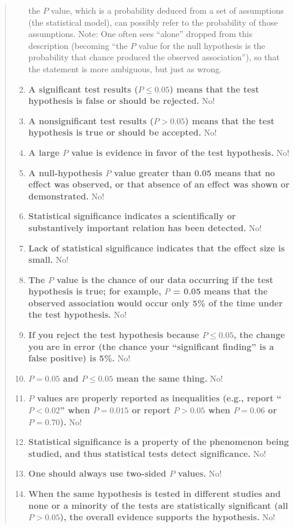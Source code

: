 \begin{quote}
\begin{enumerate}
    the $P$ value, which is a probability deduced from a set of
    assumptions (the statistical model), can possibly refer to the
    probability of those assumptions. Note: One often sees ``alone''
    dropped from this description (becoming ``the $P$ value for the null
    hypothesis is the probability that chance produced the observed
    association''), so that the statement is more ambiguous, but just
    as wrong.
  \item \textbf{A significant test results ($P\leq 0.05$) means that
      the test hypothesis is false or should be rejected.} No!
  \item \textbf{A nonsignificant test results ($P > 0.05$) means that
      the test hypothesis is true or should be accepted.} No!
  \item \textbf{A large $P$ value is evidence in favor of the test
      hypothesis.} No!
  \item \textbf{A null-hypothesis $P$ value greater than 0.05 means
      that no effect was observed, or that absence of an effect was
      shown or demonstrated.} No!
  \item \textbf{Statistical significance indicates a scientifically or
      substantively important relation has been detected.} No!
  \item \textbf{Lack of statistical significance indicates that the
      effect size is small.} No!
  \item \textbf{The $P$ value is the chance of our data occurring if
      the test hypothesis is true; for example, $P$ = 0.05 means that
      the observed association would occur only 5\% of the time under
      the test hypothesis.} No!
  \item \textbf{If you reject the test hypothesis because $P \leq
      0.05$, the change you are in error (the chance your
      ``significant finding'' is a false positive) is 5\%.} No!
  \item \textbf{$P = 0.05$ and $P \leq 0.05$ mean the same thing.} No!
  \item \textbf{$P$ values are properly reported as inequalities (e.g., report ``$P < 0.02$'' when $P = 0.015$ or report $P > 0.05$ when $P = 0.06$ or $P = 0.70$).} No!
  \item \textbf{Statistical significance is a property of the phenomenon being studied, and thus statistical tests detect significance.} No!
  \item \textbf{One should always use two-sided $P$ values.} No!
  \item \textbf{When the same hypothesis is tested in different studies and none or a minority of the tests are statistically significant (all $P > 0.05$), the overall evidence supports the hypothesis.} No!

\end{enumerate}
\end{quote}
